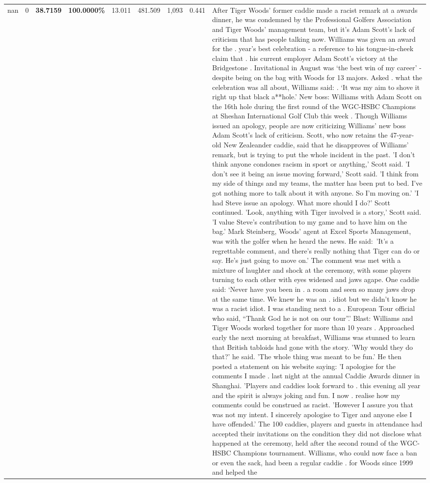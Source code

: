 \begin{table}[H]
\begin{tabular}{lllrlllll}
nan & 0 & \bfseries 38.7159 & \bfseries 100.0000\% & 13.011 & 481.509 & 1,093 & 0.441 & After Tiger Woods' former caddie made a racist remark at a awards dinner, he was condemned by the Professional Golfers Association and Tiger Woods' management team, but it's Adam Scott's lack of criticism that has people talking now. Williams was given an award for the . year’s best celebration - a reference to his tongue-in-cheek claim that . his current employer Adam Scott’s victory at the Bridgestone . Invitational in August was ‘the best win of my career’ - despite being on the bag with Woods for 13 majors. Asked . what the celebration was all about, Williams said: . ‘It was my aim to shove it right up that black a**hole.’ New boss: Williams with Adam Scott  on the 16th hole during the first round of the WGC-HSBC Champions at Sheshan International Golf Club this week . Though Williams issued an apology, people are now criticizing Williams' new boss Adam Scott's lack of criticism. Scott, who now retains the 47-year-old New Zealeander caddie, said that he disapproves of Williams' remark, but is trying to put the whole incident in the past. 'I don't think anyone condones racism in sport or anything,' Scott said. 'I don't see it being an issue moving forward,' Scott said. 'I think from my side of things and my teams, the matter has been put to bed. I've got nothing more to talk about it with anyone. So I'm moving on.' 'I had Steve issue an apology. What more should I do?' Scott continued. 'Look, anything with Tiger involved is a story,' Scott said. 'I value Steve's contribution to my game and to have him on the bag.' Mark Steinberg, Woods' agent at Excel Sports Management, was with the golfer when he heard the news. He said: 'It's a regrettable comment, and there's really nothing that Tiger can do or say. He's just going to move on.' The comment was met with a mixture of laughter and shock at the ceremony, with some players turning to each other with eyes widened and jaws agape. One caddie said: ‘Never have you been in . a room and seen so many jaws drop at the same time. We knew he was an . idiot but we didn’t know he was a racist idiot. I was standing next to a . European Tour official who said, “Thank God he is not on our tour”.’ Blast: Williams and Tiger Woods worked together for more than 10 years . Approached early the next morning at breakfast, Williams was stunned to learn that British tabloids had gone with the story. 'Why would they do that?' he said. 'The whole thing was meant to be fun.' He then posted a statement on his website saying: 'I apologise for the comments I made . last night at the annual Caddie Awards dinner in Shanghai. 'Players and caddies look forward to . this evening all year and the spirit is always joking and fun. I now . realise how my comments could be construed as racist. 'However I assure you that was not my intent. I sincerely apologise to Tiger and anyone else I have offended.' The 100 caddies, players and guests in attendance had accepted their invitations on the condition they did not disclose what happened at the ceremony, held after the second round of the WGC-HSBC Champions tournament. Williams, who could now face a ban or even the sack, had been a regular caddie . for Woods since 1999 and helped the 
\end{tabular}
\end{table}
